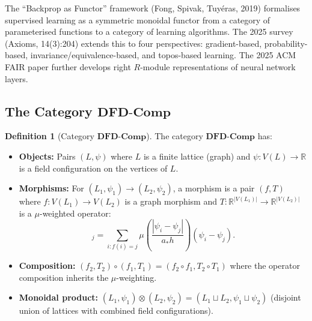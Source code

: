 \documentclass[11pt]{article}
\theoremstyle{definition}
\newtheorem{definition}[theorem]{Definition}
\theoremstyle{remark}
\begin{document}
The ``Backprop as Functor'' framework (Fong, Spivak, Tuy\'{e}ras, 2019)
formalises supervised learning as a symmetric monoidal functor from a
category of parameterised functions to a category of learning algorithms.
The 2025 survey (Axioms, 14(3):204) extends this to four perspectives:
gradient-based, probability-based, invariance/equivalence-based, and
topos-based learning. The 2025 ACM FAIR paper further develops right
$R$-module representations of neural network layers.

\subsection{The Category $\mathbf{DFD\text{-}Comp}$}
\label{sec:dfd-comp-category}

\begin{definition}[Category $\mathbf{DFD\text{-}Comp}$]
\label{def:dfd-comp}
The category $\mathbf{DFD\text{-}Comp}$ has:
\begin{itemize}
\item \textbf{Objects:} Pairs $(L, \psi)$ where $L$ is a finite lattice
  (graph) and $\psi: V(L) \to \mathbb{R}$ is a field configuration on
  the vertices of $L$.
\item \textbf{Morphisms:} For $(L_1, \psi_1) \to (L_2, \psi_2)$, a morphism
  is a pair $(f, T)$ where $f: V(L_1) \to V(L_2)$ is a graph morphism and
  $T: \mathbb{R}^{|V(L_1)|} \to \mathbb{R}^{|V(L_2)|}$ is a
  $\mu$-weighted operator:
  \begin{equation}
    [T\psi]_j = \sum_{i: f(i) = j} \mu\!\left(\frac{|\psi_i - \psi_j|}{a_* h}\right)
    (\psi_i - \psi_j).
    \label{eq:mu-morphism}
  \end{equation}
\item \textbf{Composition:} $(f_2, T_2) \circ (f_1, T_1) = (f_2 \circ f_1,
  T_2 \circ T_1)$ where the operator composition inherits the $\mu$-weighting.
\item \textbf{Monoidal product:} $(L_1, \psi_1) \otimes (L_2, \psi_2) =
  (L_1 \sqcup L_2, \psi_1 \sqcup \psi_2)$ (disjoint union of lattices
  with combined field configurations).
\end{itemize}
\end{definition}
\end{document}
